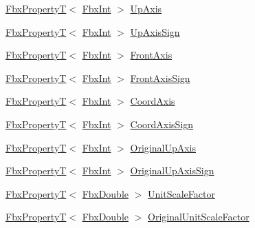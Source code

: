 \begin{DoxyCompactItemize}
\item 
\hyperlink{class_fbx_property_t}{Fbx\+PropertyT}$<$ \hyperlink{fbxtypes_8h_a088fa96de3b0b3ea69f0f6afef525dfb}{Fbx\+Int} $>$ \hyperlink{class_fbx_global_settings_a58ba7d81b79cba1243bfb4103b00f4f4}{Up\+Axis}
\item 
\hyperlink{class_fbx_property_t}{Fbx\+PropertyT}$<$ \hyperlink{fbxtypes_8h_a088fa96de3b0b3ea69f0f6afef525dfb}{Fbx\+Int} $>$ \hyperlink{class_fbx_global_settings_a12aa2b225f1fcc4999c2830062411c5d}{Up\+Axis\+Sign}
\item 
\hyperlink{class_fbx_property_t}{Fbx\+PropertyT}$<$ \hyperlink{fbxtypes_8h_a088fa96de3b0b3ea69f0f6afef525dfb}{Fbx\+Int} $>$ \hyperlink{class_fbx_global_settings_a48a64f3e8d881ee0f44053786561a59a}{Front\+Axis}
\item 
\hyperlink{class_fbx_property_t}{Fbx\+PropertyT}$<$ \hyperlink{fbxtypes_8h_a088fa96de3b0b3ea69f0f6afef525dfb}{Fbx\+Int} $>$ \hyperlink{class_fbx_global_settings_a9e73a39a5c1d4df68b7a5d7efc668ddd}{Front\+Axis\+Sign}
\item 
\hyperlink{class_fbx_property_t}{Fbx\+PropertyT}$<$ \hyperlink{fbxtypes_8h_a088fa96de3b0b3ea69f0f6afef525dfb}{Fbx\+Int} $>$ \hyperlink{class_fbx_global_settings_abd52fb7c521c43e362cb8e4da34c016d}{Coord\+Axis}
\item 
\hyperlink{class_fbx_property_t}{Fbx\+PropertyT}$<$ \hyperlink{fbxtypes_8h_a088fa96de3b0b3ea69f0f6afef525dfb}{Fbx\+Int} $>$ \hyperlink{class_fbx_global_settings_a852574ae7173bcc4989accb9688ea013}{Coord\+Axis\+Sign}
\item 
\hyperlink{class_fbx_property_t}{Fbx\+PropertyT}$<$ \hyperlink{fbxtypes_8h_a088fa96de3b0b3ea69f0f6afef525dfb}{Fbx\+Int} $>$ \hyperlink{class_fbx_global_settings_a10e95e9c826439215508c788cfdad514}{Original\+Up\+Axis}
\item 
\hyperlink{class_fbx_property_t}{Fbx\+PropertyT}$<$ \hyperlink{fbxtypes_8h_a088fa96de3b0b3ea69f0f6afef525dfb}{Fbx\+Int} $>$ \hyperlink{class_fbx_global_settings_a22385a53e9b333a7d3708a787724ade4}{Original\+Up\+Axis\+Sign}
\item 
\hyperlink{class_fbx_property_t}{Fbx\+PropertyT}$<$ \hyperlink{fbxtypes_8h_a171e72a1c46fc15c1a6c9c31948c1c5b}{Fbx\+Double} $>$ \hyperlink{class_fbx_global_settings_a48b74d9a08238419a74fd748000ed7bd}{Unit\+Scale\+Factor}
\item 
\hyperlink{class_fbx_property_t}{Fbx\+PropertyT}$<$ \hyperlink{fbxtypes_8h_a171e72a1c46fc15c1a6c9c31948c1c5b}{Fbx\+Double} $>$ \hyperlink{class_fbx_global_settings_aacabbbe70923f27acded514e698ad399}{Original\+Unit\+Scale\+Factor}

\end{DoxyCompactItemize}
